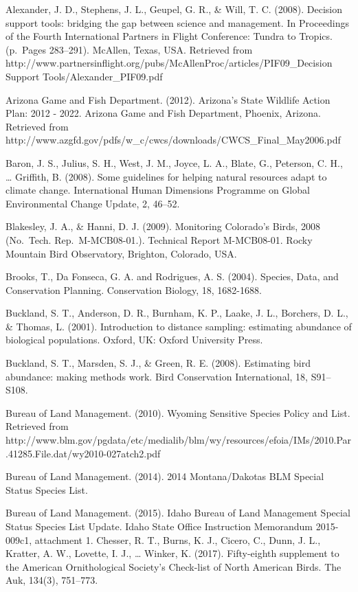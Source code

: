 \documentclass[
  letterpaper,
  DIV=11,
  numbers=noendperiod,
  oneside]{scrreprt}
\begin{document}
Alexander, J. D., Stephens, J. L., Geupel, G. R., \& Will, T. C. (2008).
Decision support tools: bridging the gap between science and management.
In Proceedings of the Fourth International Partners in Flight
Conference: Tundra to Tropics. (p.~Pages 283--291). McAllen, Texas, USA.
Retrieved from
http://www.partnersinflight.org/pubs/McAllenProc/articles/PIF09\_Decision
Support Tools/Alexander\_PIF09.pdf

Arizona Game and Fish Department. (2012). Arizona's State Wildlife
Action Plan: 2012 - 2022. Arizona Game and Fish Department, Phoenix,
Arizona. Retrieved from
http://www.azgfd.gov/pdfs/w\_c/cwcs/downloads/CWCS\_Final\_May2006.pdf

Baron, J. S., Julius, S. H., West, J. M., Joyce, L. A., Blate, G.,
Peterson, C. H., \ldots{} Griffith, B. (2008). Some guidelines for
helping natural resources adapt to climate change. International Human
Dimensions Programme on Global Environmental Change Update, 2, 46--52.

Blakesley, J. A., \& Hanni, D. J. (2009). Monitoring Colorado's Birds,
2008 (No.~Tech. Rep.~M-MCB08-01.). Technical Report M-MCB08-01. Rocky
Mountain Bird Observatory, Brighton, Colorado, USA.

Brooks, T., Da Fonseca, G. A. and Rodrigues, A. S. (2004). Species,
Data, and Conservation Planning. Conservation Biology, 18, 1682-1688.

Buckland, S. T., Anderson, D. R., Burnham, K. P., Laake, J. L.,
Borchers, D. L., \& Thomas, L. (2001). Introduction to distance
sampling: estimating abundance of biological populations. Oxford, UK:
Oxford University Press.

Buckland, S. T., Marsden, S. J., \& Green, R. E. (2008). Estimating bird
abundance: making methods work. Bird Conservation International, 18,
S91--S108.

Bureau of Land Management. (2010). Wyoming Sensitive Species Policy and
List. Retrieved from
http://www.blm.gov/pgdata/etc/medialib/blm/wy/resources/efoia/IMs/2010.Par.41285.File.dat/wy2010-027atch2.pdf

Bureau of Land Management. (2014). 2014 Montana/Dakotas BLM Special
Status Species List.

Bureau of Land Management. (2015). Idaho Bureau of Land Management
Special Status Species List Update. Idaho State Office Instruction
Memorandum 2015-009c1, attachment 1. Chesser, R. T., Burns, K. J.,
Cicero, C., Dunn, J. L., Kratter, A. W., Lovette, I. J., \ldots{}
Winker, K. (2017). Fifty-eighth supplement to the American
Ornithological Society's Check-list of North American Birds. The Auk,
134(3), 751--773.
\end{document}
